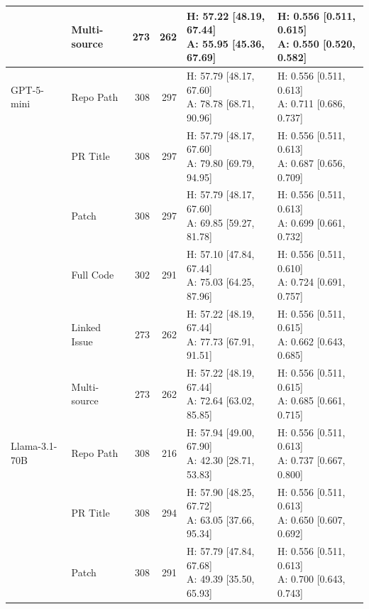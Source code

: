 \begin{table}[tbp]
\begin{tabular}{llrrll}
 & Multi-source & 273 & 262 & \shortstack[l]{H: 57.22 [48.19, 67.44]\\A: 55.95 [45.36, 67.69]} & \shortstack[l]{H: 0.556 [0.511, 0.615]\\A: 0.550 [0.520, 0.582]} \\
\midrule
GPT-5-mini & Repo Path & 308 & 297 & \shortstack[l]{H: 57.79 [48.17, 67.60]\\A: 78.78 [68.71, 90.96]} & \shortstack[l]{H: 0.556 [0.511, 0.613]\\A: 0.711 [0.686, 0.737]} \\
 & PR Title & 308 & 297 & \shortstack[l]{H: 57.79 [48.17, 67.60]\\A: 79.80 [69.79, 94.95]} & \shortstack[l]{H: 0.556 [0.511, 0.613]\\A: 0.687 [0.656, 0.709]} \\
 & Patch & 308 & 297 & \shortstack[l]{H: 57.79 [48.17, 67.60]\\A: 69.85 [59.27, 81.78]} & \shortstack[l]{H: 0.556 [0.511, 0.613]\\A: 0.699 [0.661, 0.732]} \\
 & Full Code & 302 & 291 & \shortstack[l]{H: 57.10 [47.84, 67.44]\\A: 75.03 [64.25, 87.96]} & \shortstack[l]{H: 0.556 [0.511, 0.610]\\A: 0.724 [0.691, 0.757]} \\
 & Linked Issue & 273 & 262 & \shortstack[l]{H: 57.22 [48.19, 67.44]\\A: 77.73 [67.91, 91.51]} & \shortstack[l]{H: 0.556 [0.511, 0.615]\\A: 0.662 [0.643, 0.685]} \\
 & Multi-source & 273 & 262 & \shortstack[l]{H: 57.22 [48.19, 67.44]\\A: 72.64 [63.02, 85.85]} & \shortstack[l]{H: 0.556 [0.511, 0.615]\\A: 0.685 [0.661, 0.715]} \\
\midrule
Llama-3.1-70B & Repo Path & 308 & 216 & \shortstack[l]{H: 57.94 [49.00, 67.90]\\A: 42.30 [28.71, 53.83]} & \shortstack[l]{H: 0.556 [0.511, 0.613]\\A: 0.737 [0.667, 0.800]} \\
 & PR Title & 308 & 294 & \shortstack[l]{H: 57.90 [48.25, 67.72]\\A: 63.05 [37.66, 95.34]} & \shortstack[l]{H: 0.556 [0.511, 0.613]\\A: 0.650 [0.607, 0.692]} \\
 & Patch & 308 & 291 & \shortstack[l]{H: 57.79 [47.84, 67.68]\\A: 49.39 [35.50, 65.93]} & \shortstack[l]{H: 0.556 [0.511, 0.613]\\A: 0.700 [0.643, 0.743]} \\

\end{tabular}
\end{table}
